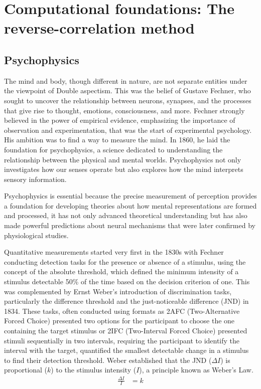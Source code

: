 \renewcommand{\chaptername}{Chapter} 
\chapter{Computational foundations: The reverse-correlation method}\label{chap3}


\section {Psychophysics} 
The mind and body, though different in nature, are not separate entities under the viewpoint of Double aspectism. This was the belief of Gustave Fechner, who sought to uncover the relationship between neurons, synapses, and the processes that give rise to thought, emotions, consciousness, and more. Fechner strongly believed in the power of empirical evidence, emphasizing the importance of observation and experimentation, that was the start of experimental psychology. His ambition was to find a way to measure the mind. In 1860, he laid the foundation for psychophysics, a science dedicated to understanding the relationship between the physical and mental worlds. Psychophysics not only investigates how our senses operate but also explores how the mind interprets sensory information.

Psychophysics is essential because the precise measurement of perception provides a foundation for developing theories about how mental representations are formed and processed, it has not only advanced theoretical understanding but has also made powerful predictions about neural mechanisms that were later confirmed by physiological studies. 

Quantitative measurements started very first in the 1830s with Fechner conducting detection tasks for the presence or absence of a stimulus, using the concept of the absolute threshold, which defined the minimum intensity of a stimulus detectable 50\% of the time  based on the decision criterion of one. This was complemented by Ernst Weber’s introduction of discrimination tasks, particularly the difference threshold and the just-noticeable difference (JND) in 1834. These tasks, often conducted using formats as 2AFC (Two-Alternative Forced Choice) presented two options for the participant to choose the one containing the target stimulus or 2IFC (Two-Interval Forced Choice) presented stimuli sequentially in two intervals, requiring the participant to identify the interval with the target, quantified the smallest detectable change in a stimulus to find their detection threshold. Weber established that the JND ($\Delta I$) is proportional ($k$) to the stimulus intensity ($I$), a principle known as Weber’s Law. \cite{falmagne_elements_1985}
\begin{align}
\frac{\Delta I}{I}& = k 
\end{align}

